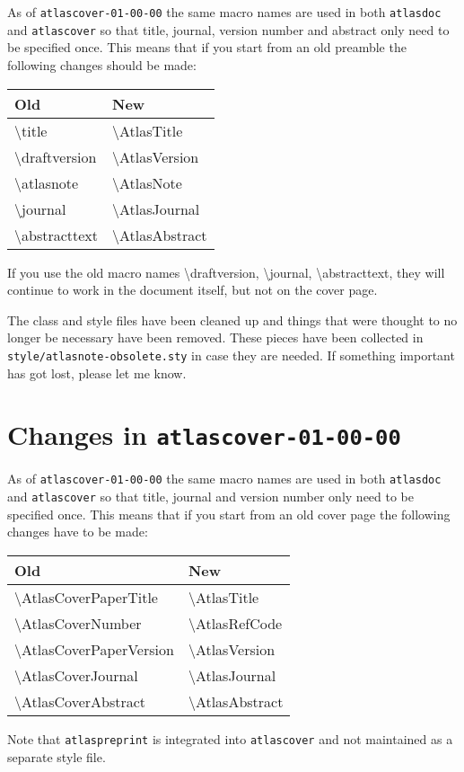 \documentclass[UKenglish]{style/atlasdoc}
\newcommand{\Macro}[1]{\textbackslash #1\xspace}
\begin{document}
As of \texttt{atlascover-01-00-00} the same macro names are used in both \texttt{atlasdoc} and
\texttt{atlascover} so that title, journal, version number and abstract only need to be specified once.
This means that if you start from an old preamble the following changes should be made:
\begin{center}
	\begin{tabular}{ll}
		Old	& New\\
		\midrule
		\Macro{title} & \Macro{AtlasTitle}\\
		\Macro{draftversion} & \Macro{AtlasVersion}\\
		\Macro{atlasnote} & \Macro{AtlasNote}\\
		\Macro{journal} & \Macro{AtlasJournal}\\
		\Macro{abstracttext} & \Macro{AtlasAbstract}
	\end{tabular}
\end{center}
If you use the old macro names 
\Macro{draftversion}, \Macro{journal}, \Macro{abstracttext},
they will continue to work in the document itself, but not on the cover page.

The class and style files have been cleaned up and things 
that were thought to no longer be necessary have been removed.
These pieces have been collected in \texttt{style/atlasnote-obsolete.sty} in case they are needed.
If something important has got lost, please let me know.

\section{Changes in \texttt{atlascover-01-00-00}}
\label{sec:oldcover}

As of \texttt{atlascover-01-00-00} the same macro names are used in both \texttt{atlasdoc} and
\texttt{atlascover} so that title, journal and version number only need to be specified once.
This means that if you start from an old cover page the following changes have to be made:
\begin{center}
	\begin{tabular}{ll}
		Old	& New\\
		\midrule
		\Macro{AtlasCoverPaperTitle} & \Macro{AtlasTitle}\\
		\Macro{AtlasCoverNumber}  & \Macro{AtlasRefCode}\\
		\Macro{AtlasCoverPaperVersion} & \Macro{AtlasVersion}\\
		\Macro{AtlasCoverJournal} & \Macro{AtlasJournal}\\
		\Macro{AtlasCoverAbstract} & \Macro{AtlasAbstract}
	\end{tabular}
\end{center}
Note that \texttt{atlaspreprint} is integrated into \texttt{atlascover} and not maintained as a separate style file.
\end{document}
